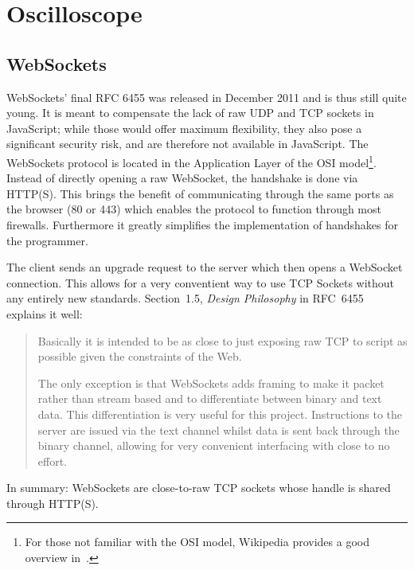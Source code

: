 %
%
\chapter{Oscilloscope} %
\label{ch:app:gui}

%
%
\section{WebSockets} %
\label{sec:app:gui:websockets}

WebSockets' final RFC 6455\cite{rfc:6455} was released in December 2011 and is
thus still quite young. It is meant to  compensate the lack of raw UDP and TCP
sockets in JavaScript; while those  would offer maximum flexibility, they also
pose  a  significant  security  risk,  and  are  therefore  not  available  in
JavaScript.  The  WebSockets protocol is  located in the Application  Layer of
the OSI model\footnote{%
    For  those not  familiar with  the OSI  model, Wikipedia  provides a  good
    overview in~\cite{wiki:osi}.%
}.
Instead  of directly  opening  a  raw WebSocket,  the  handshake  is done  via
HTTP(S). This brings  the benefit of  communicating through the same  ports as
the browser  (\num{80} or  \num{443}) which enables  the protocol  to function
through most  firewalls. Furthermore it greatly simplifies  the implementation
of handshakes for the programmer.

The client sends an upgrade request to the server which then opens a WebSocket
connection.   This allows  for  a  very conventient  way  to  use TCP  Sockets
without any entirely new  standards.  Section~1.5, \emph{Design Philosophy} in
RFC~6455~\cite{rfc:6455} explains it well:
\begin{quote}
    Basically it is intended to be as close to just exposing raw TCP to script
    as possible given the constraints of the Web.

    The  only exception  is that  WebSockets adds  framing to  make it  packet
    rather  than stream  based and  to differentiate  between binary  and text
    data.  This differentiation is  very useful for this project. Instructions
    to the  server are issued  via the text channel  whilst data is  sent back
    through the binary channel, allowing  for very convenient interfacing with
    close to no effort.
\end{quote}
In summary: WebSockets  are close-to-raw  TCP sockets  whose handle  is shared
through HTTP(S).


